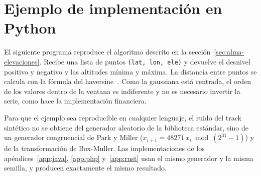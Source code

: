 \documentclass[11pt,a4paper]{article}
\begin{document}
\appendix
\clearpage
\section{Ejemplo de implementación en Python}
\label{app:python}

El siguiente programa reproduce el algoritmo descrito en la
sección~\ref{sec:alma-elevaciones}. Recibe una lista de puntos
\texttt{(lat, lon, ele)} y devuelve el desnivel positivo y negativo y las
altitudes mínima y máxima. La distancia entre puntos se calcula con la fórmula
del haversine~\cite{sinnott}. Como la gaussiana está centrada, el orden de los
valores dentro de la ventana es indiferente y no es necesario invertir la
serie, como hace la implementación financiera.

Para que el ejemplo sea reproducible en cualquier lenguaje, el ruido del track
sintético no se obtiene del generador aleatorio de la biblioteca estándar, sino
de un generador congruencial de Park y Miller ($x_{i+1} = 48271\, x_i \bmod
(2^{31} - 1)$) y de la transformación de Box-Muller. Las implementaciones de
los apéndices~\ref{app:java}, \ref{app:php} y~\ref{app:rust} usan el mismo
generador y la misma semilla, y producen exactamente el mismo resultado.
\end{document}
